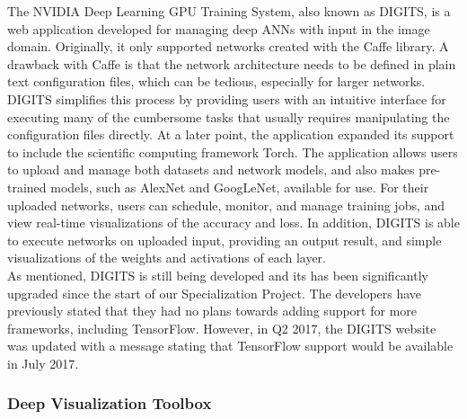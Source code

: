 The NVIDIA Deep Learning GPU Training System, also known as DIGITS, is a web application developed for managing deep ANNs with input in the image domain. Originally, it only supported networks created with the Caffe library. A drawback with Caffe is that the network architecture needs to be defined in plain text configuration files, which can be tedious, especially for larger networks. DIGITS simplifies this process by providing users with an intuitive interface for executing many of the cumbersome tasks that usually requires manipulating the configuration files directly. At a later point, the application expanded its support to include the scientific computing framework Torch. The application allows users to upload and manage both datasets and network models, and also makes pre-trained models, such as AlexNet and GoogLeNet, available for use. For their uploaded networks, users can schedule, monitor, and manage training jobs, and view real-time visualizations of the accuracy and loss. In addition, DIGITS is able to execute networks on uploaded input, providing an output result, and simple visualizations of the weights and activations of each layer. \\

\noindent As mentioned, DIGITS is still being developed and its has been significantly upgraded since the start of our Specialization Project. The developers have previously stated that they had no plans towards adding support for more frameworks, including TensorFlow. However, in Q2 2017, the DIGITS website was updated with a message stating that TensorFlow support would be available in July 2017.

\begin{comment}
Drawbacks:
- Still does not support Keras.
- No advanced visualizations.
\end{comment}

\subsubsection{Deep Visualization Toolbox}

\begin{comment}
\textit{The Deep Visualization Toolbox \cite{yosinski-deepvis} is a software tool that provides an interactive visualization of a trained artificial convolutional neural network as the network responds to user-provided input, either an uploaded image or video from a live webcam feed. The toolbox is developed for networks created in Caffe. It comes with a default network, but also includes the possibility of adapting your own networks. Users can view the filters of a selected layer, either as actual activations or as images synthesized to produce high activations through deep visualization. A specific neuron can be selected to explore further. This will show deep visualizations, the top nine images from the training set that activates the filter the most, and the pixels from those images most responsible for the high activations, computed via the deconvolution technique. Note that these last three visualizations are pre computed instead of computed in real time, since they are far too expensive to run live.}
\end{comment}

